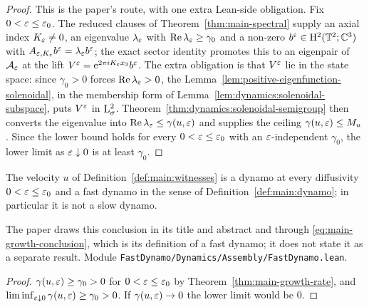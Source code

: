 \begin{proof}
  \leanok
  This is the paper's route, with one extra Lean-side obligation.  Fix
  $0<\varepsilon\leq\varepsilon_0$.  The reduced clauses of Theorem~\ref{thm:main-spectral}
  supply an axial index $K_\varepsilon\neq0$, an eigenvalue $\lambda_\varepsilon$ with
  $\operatorname{Re}\lambda_\varepsilon\geq\gamma_0$ and a non-zero $b^\varepsilon\in\mathrm{H}^2(\mathbb{T}^2;\mathbb{C}^3)$ with
  $A_{\varepsilon,K_\varepsilon}b^\varepsilon=\lambda_\varepsilon b^\varepsilon$; the exact sector identity promotes
  this to an eigenpair of $\mathcal{A}_\varepsilon$ at the lift
  $V^\varepsilon=\mathrm{e}^{2\pi iK_\varepsilon x_3}b^\varepsilon$.  The extra obligation is that $V^\varepsilon$
  lie in the state space: since $\gamma_0>0$ forces $\operatorname{Re}\lambda_\varepsilon>0$, the
  Lemma~\ref{lem:positive-eigenfunction-solenoidal}, in the membership
  form of Lemma~\ref{lem:dynamics:solenoidal-subspace}, puts $V^\varepsilon$ in
  $\mathrm{L}^2_\sigma$.  Theorem~\ref{thm:dynamics:solenoidal-semigroup} then converts
  the eigenvalue into $\operatorname{Re}\lambda_\varepsilon\leq\gamma(u,\varepsilon)$ and supplies the
  ceiling $\gamma(u,\varepsilon)\leq M_u$.  Since the lower bound holds for every
  $0<\varepsilon\leq\varepsilon_0$ with an $\varepsilon$-independent $\gamma_0$, the lower limit as
  $\varepsilon\downarrow0$ is at least $\gamma_0$.
\end{proof}

\begin{corollary}
  \label{cor:main:fast-dynamo}
  \leanok
  The velocity $u$ of Definition~\ref{def:main:witnesses} is a dynamo at every diffusivity
  $0<\varepsilon\leq\varepsilon_0$ and a fast dynamo in the sense of Definition~\ref{def:main:dynamo}; in
  particular it is not a slow dynamo.
\end{corollary}

The paper draws this conclusion in its title and abstract and through
\eqref{eq:main-growth-conclusion}, which is its definition of a fast dynamo; it does not state
it as a separate result.  Module \texttt{FastDynamo/Dynamics/Assembly/FastDynamo.lean}.

\begin{proof}
  \leanok
  $\gamma(u,\varepsilon)\geq\gamma_0>0$ for $0<\varepsilon\leq\varepsilon_0$ by Theorem~\ref{thm:main-growth-rate},
  and $\liminf_{\varepsilon\downarrow0}\gamma(u,\varepsilon)\geq\gamma_0>0$.  If $\gamma(u,\varepsilon)\to0$ the
  lower limit would be $0$.
\end{proof}


